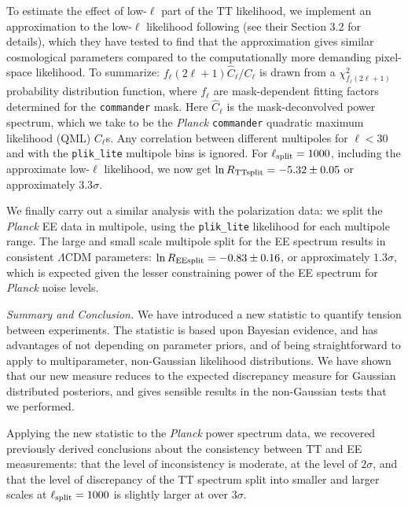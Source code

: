 \documentclass[amsmath, amssymb, reprint, aps]{revtex4-1}
\begin{document}
{    To estimate the effect of low-$\ell$ part of the TT likelihood, we implement an approximation to the low-$\ell$ likelihood following \cite{Aghanim:2016sns} (see their Section 3.2 for details), which they have tested to find that the approximation gives similar cosmological parameters compared to the computationally more demanding pixel-space likelihood. To summarize: $f_\ell(2\ell+1) \hat{C}_\ell/C_\ell$ is drawn from a $\chi^2_{f_\ell(2\ell+1)}$ probability distribution function, where $f_\ell$ are mask-dependent fitting factors determined for the {\tt commander} mask. Here $\hat{C}_\ell$ is the mask-deconvolved power spectrum, which we take to be the {\it Planck} {\tt commander} quadratic maximum likelihood (QML) $C_\ell$s. Any correlation between different multipoles for $\ell<30$ and with the {\tt plik\_lite} multipole bins is ignored. For $\ell_{\rm split}=1000$, including the approximate low-$\ell$ likelihood, we now get $\ln R_{\rm TTsplit}=-5.32 \pm 0.05$ or approximately $3.3\sigma$. 
        
    We finally carry out a similar analysis with the polarization data: we split the {\it Planck} EE data in multipole, using the {\tt plik\_lite} likelihood for each multipole range. The large and small scale multipole split for the EE spectrum results in consistent $\Lambda$CDM parameters: $\ln R_{\rm EEsplit}=-0.83\pm 0.16$, or approximately $1.3 \sigma$, which is expected given the lesser constraining power of the EE spectrum for {\it Planck} noise levels. 
        
    \medskip
    \textit{Summary and Conclusion.} 
    We have introduced a new statistic to quantify tension between experiments. The statistic is based upon Bayesian evidence, and has advantages of not depending on parameter priors, and of being straightforward to apply to multiparameter, non-Gaussian likelihood distributions. We have shown that our new measure reduces to the expected discrepancy measure for Gaussian distributed posteriors, and gives sensible results in the non-Gaussian tests that we performed. 
        
    Applying {the new statistic} to the {\it Planck} power spectrum data, we {recovered} previously derived conclusions about the consistency between TT and EE measurements: that the level of inconsistency is moderate, at the level of $2 \sigma$, and that the level of discrepancy of the TT spectrum {split} into smaller and larger scales at $\ell_{\rm split}=1000$ is slightly larger at over $3 \sigma$.
        
}
\end{document}
